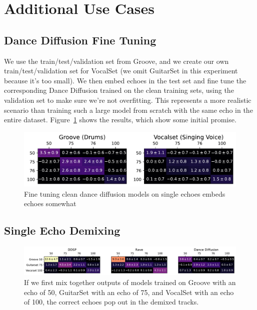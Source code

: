 \documentclass[letterpaper]{article} %
\begin{document}
\section{Additional Use Cases}


\subsection{Dance Diffusion Fine Tuning}



We use the train/test/validation set from Groove, and we create our own train/test/validation set for VocalSet (we omit GuitarSet in this experiment because it's too small).  We then embed echoes in the test set and fine tune the corresponding Dance Diffusion trained on the clean training sets, using the validation set to make sure we're not overfitting.  This represents a more realistic scenario than training such a large model from scratch with the same echo in the entire dataset.  Figure~\ref{fig:finetuning} shows the results, which show some initial promise.

\begin{figure}
    \centering
    \includegraphics[width=\columnwidth]{figs/FineTunedZScores.pdf}
    \caption{Fine tuning clean dance diffusion models on single echoes embeds echoes somewhat}
    \label{fig:finetuning}
\end{figure}


\subsection{Single Echo Demixing}

\begin{figure}
    \centering
    \includegraphics[width=\textwidth]{figs/DemucsZScores.pdf}
    \caption{If we first mix together outputs of models trained on Groove with an echo of 50, GuitarSet with an echo of 75, and VocalSet with an echo of 100, the correct echoes pop out in the demixed tracks.}
    \label{fig:demucszscores}
\end{figure}
\end{document}
